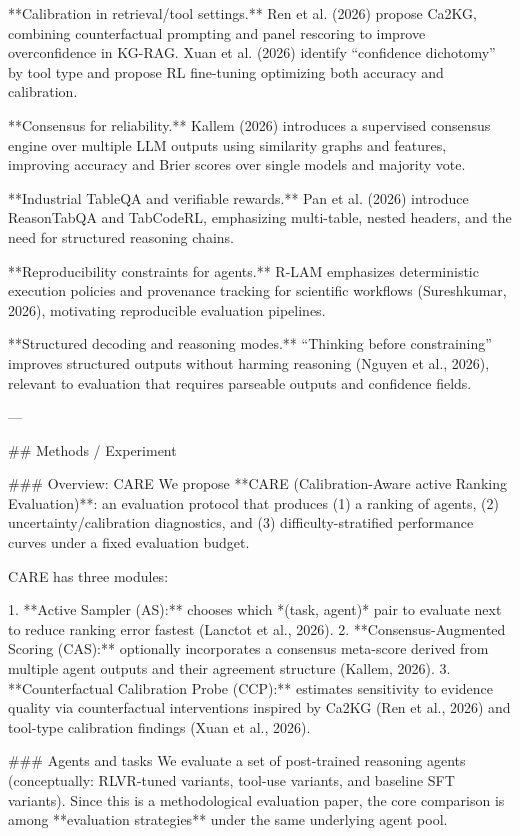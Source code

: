 **Calibration in retrieval/tool settings.** Ren et al. (2026) propose Ca2KG, combining counterfactual prompting and panel rescoring to improve overconfidence in KG-RAG. Xuan et al. (2026) identify “confidence dichotomy” by tool type and propose RL fine-tuning optimizing both accuracy and calibration.

**Consensus for reliability.** Kallem (2026) introduces a supervised consensus engine over multiple LLM outputs using similarity graphs and features, improving accuracy and Brier scores over single models and majority vote.

**Industrial TableQA and verifiable rewards.** Pan et al. (2026) introduce ReasonTabQA and TabCodeRL, emphasizing multi-table, nested headers, and the need for structured reasoning chains.

**Reproducibility constraints for agents.** R-LAM emphasizes deterministic execution policies and provenance tracking for scientific workflows (Sureshkumar, 2026), motivating reproducible evaluation pipelines.

**Structured decoding and reasoning modes.** “Thinking before constraining” improves structured outputs without harming reasoning (Nguyen et al., 2026), relevant to evaluation that requires parseable outputs and confidence fields.

---

## Methods / Experiment

### Overview: CARE
We propose **CARE (Calibration-Aware active Ranking Evaluation)**: an evaluation protocol that produces (1) a ranking of agents, (2) uncertainty/calibration diagnostics, and (3) difficulty-stratified performance curves under a fixed evaluation budget.

CARE has three modules:

1. **Active Sampler (AS):** chooses which *(task, agent)* pair to evaluate next to reduce ranking error fastest (Lanctot et al., 2026).
2. **Consensus-Augmented Scoring (CAS):** optionally incorporates a consensus meta-score derived from multiple agent outputs and their agreement structure (Kallem, 2026).
3. **Counterfactual Calibration Probe (CCP):** estimates sensitivity to evidence quality via counterfactual interventions inspired by Ca2KG (Ren et al., 2026) and tool-type calibration findings (Xuan et al., 2026).

### Agents and tasks
We evaluate a set of post-trained reasoning agents (conceptually: RLVR-tuned variants, tool-use variants, and baseline SFT variants). Since this is a methodological evaluation paper, the core comparison is among **evaluation strategies** under the same underlying agent pool.

